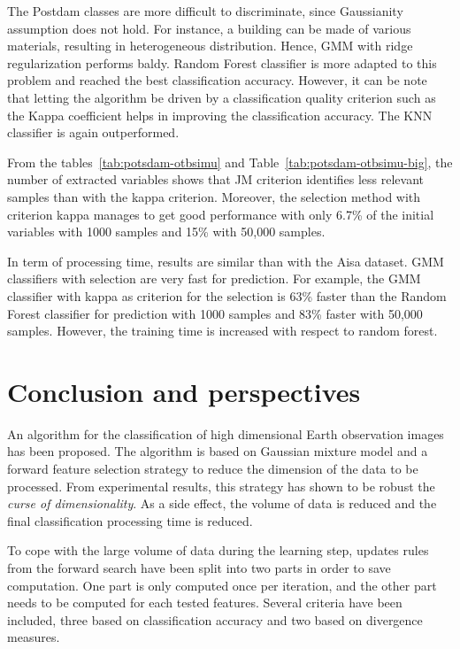 \documentclass[journal,10pt]{IEEEtran}
\begin{document}
    The  Postdam classes  are  more difficult  to discriminate,  since
    Gaussianity assumption  does not  hold. For instance,  a building
    can  be  made of  various  materials,  resulting in  heterogeneous
    distribution.   Hence,  GMM  with  ridge  regularization  performs
    baldy. Random  Forest classifier is  more adapted to  this problem
    and reached the  best classification accuracy. However,  it can be
    note  that letting  the algorithm  be driven  by a  classification
    quality criterion such as the Kappa coefficient helps in improving
    the  classification   accuracy.  The   KNN  classifier   is  again
    outperformed.

    From        the        tables~\ref{tab:potsdam-otbsimu}        and
    Table~\ref{tab:potsdam-otbsimu-big},   the  number   of  extracted
    variables shows that JM criterion identifies less relevant samples
    than with the kappa criterion. Moreover, the selection method with
    criterion kappa manages to get good performance with only 6.7\% of
    the  initial variables  with  1000 samples  and  15\% with  50,000
    samples.

    In term of processing time, results are similar than with the Aisa
    dataset.  GMM  classifiers  with   selection  are  very  fast  for
    prediction.  For  example,  the   GMM  classifier  with  kappa  as
    criterion for the selection is  63\% faster than the Random Forest
    classifier for prediction  with 1000 samples and  83\% faster with
    50,000  samples.  However, the  training  time  is increased  with
    respect to random forest.

\section{Conclusion and perspectives}
\label{sec:conclusion}

An algorithm for the classification of high dimensional Earth observation images has been proposed. The algorithm is based on Gaussian mixture model and a forward feature selection strategy to reduce the dimension of the data to be processed. From experimental results, this strategy has shown to be robust the \emph{curse of dimensionality}. As a side effect, the volume of data is reduced and the final classification processing time is reduced. 

To cope with the large volume of data during the learning step, updates rules from the forward search have been split into two parts in order to save computation. One part is only computed once per iteration, and the other part needs to be computed for each tested features. Several criteria have been included, three based on classification accuracy and two based on divergence measures.
\end{document}
